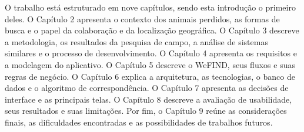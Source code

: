 O trabalho está estruturado em nove capítulos, sendo esta introdução o primeiro deles. O Capítulo 2 apresenta o contexto dos animais perdidos, as formas de busca e o papel da colaboração e da localização geográfica. O Capítulo 3 descreve a metodologia, os resultados da pesquisa de campo, a análise de sistemas similares e o processo de desenvolvimento. O Capítulo 4 apresenta os requisitos e a modelagem do aplicativo. O Capítulo 5 descreve o WeFIND, seus fluxos e suas regras de negócio. O Capítulo 6 explica a arquitetura, as tecnologias, o banco de dados e o algoritmo de correspondência. O Capítulo 7 apresenta as decisões de interface e as principais telas. O Capítulo 8 descreve a avaliação de usabilidade, seus resultados e suas limitações. Por fim, o Capítulo 9 reúne as considerações finais, as dificuldades encontradas e as possibilidades de trabalhos futuros.
